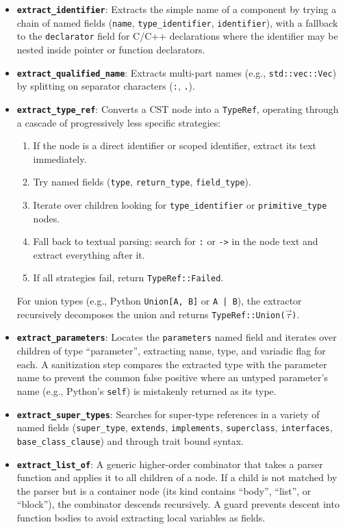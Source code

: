\begin{itemize}
  \item \textbf{\texttt{extract\_identifier}}: Extracts the simple name of a component by trying a chain of named fields (\texttt{name}, \texttt{type\_identifier}, \texttt{identifier}), with a fallback to the \texttt{declarator} field for C/C++ declarations where the identifier may be nested inside pointer or function declarators.
  \item \textbf{\texttt{extract\_qualified\_name}}: Extracts multi-part names (e.g., \texttt{std::vec::Vec}) by splitting on separator characters (\texttt{:}, \texttt{.}).
  \item \textbf{\texttt{extract\_type\_ref}}: Converts a CST node into a \texttt{TypeRef}, operating through a cascade of progressively less specific strategies:
    \begin{enumerate}
      \item If the node is a direct identifier or scoped identifier, extract its text immediately.
      \item Try named fields (\texttt{type}, \texttt{return\_type}, \texttt{field\_type}).
      \item Iterate over children looking for \texttt{type\_identifier} or \texttt{primitive\_type} nodes.
      \item Fall back to textual parsing: search for \texttt{:} or \texttt{->} in the node text and extract everything after it.
      \item If all strategies fail, return \texttt{TypeRef::Failed}.
    \end{enumerate}
    For union types (e.g., Python \texttt{Union[A, B]} or \texttt{A | B}), the extractor recursively decomposes the union and returns \texttt{TypeRef::Union($\vec{\tau}$)}.
  \item \textbf{\texttt{extract\_parameters}}: Locates the \texttt{parameters} named field and iterates over children of type ``parameter'', extracting name, type, and variadic flag for each. A sanitization step compares the extracted type with the parameter name to prevent the common false positive where an untyped parameter's name (e.g., Python's \texttt{self}) is mistakenly returned as its type.
  \item \textbf{\texttt{extract\_super\_types}}: Searches for super-type references in a variety of named fields (\texttt{super\_type}, \texttt{extends}, \texttt{implements}, \texttt{superclass}, \texttt{interfaces}, \texttt{base\_class\_clause}) and through trait bound syntax.
  \item \textbf{\texttt{extract\_list\_of}}: A generic higher-order combinator that takes a parser function and applies it to all children of a node. If a child is not matched by the parser but is a container node (its kind contains ``body'', ``list'', or ``block''), the combinator descends recursively. A guard prevents descent into function bodies to avoid extracting local variables as fields.
\end{itemize}

